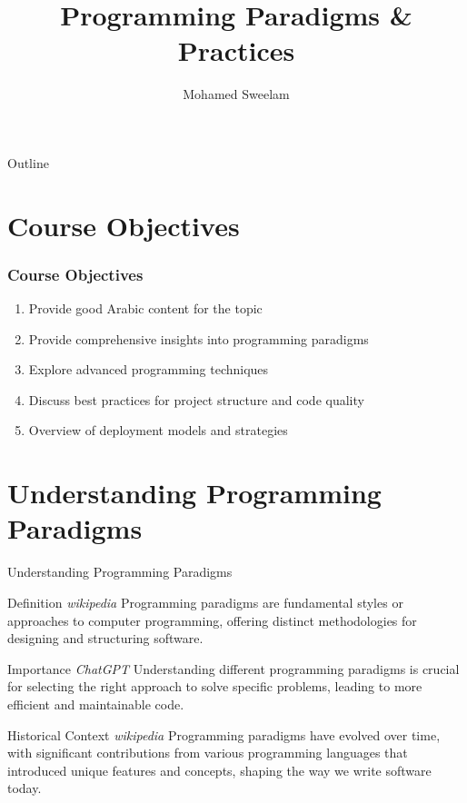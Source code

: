 \documentclass{beamer}
\title{Programming Paradigms \& Practices}
\author{Mohamed Sweelam}
\institute{Software Engineer}
\date{}
\begin{document}
\begin{frame}
  \titlepage
\end{frame}

\begin{frame}{Outline}
  \tableofcontents
\end{frame}

\section{Course Objectives}
\begin{frame}
	\frametitle{Course Objectives}
		\begin{enumerate}
			\item<1-> Provide good Arabic content for the topic
			\item<2-> Provide comprehensive insights into programming paradigms
			\item<3-> Explore advanced programming techniques
			\item<4-> Discuss best practices for project structure and code quality
			\item<5-> Overview of deployment models and strategies
		\end{enumerate}
\end{frame}

\section{Understanding Programming Paradigms}
\begin{frame}{Understanding Programming Paradigms}
	\scriptsize
	\begin{block}{Definition \tiny{\textit{wikipedia}}}
		Programming paradigms are fundamental styles or approaches to computer programming, offering distinct methodologies for designing and structuring software.
	\end{block}
	
	\begin{block}{Importance \tiny{\textit{ChatGPT}}}
		Understanding different programming paradigms is crucial for selecting the right approach to solve specific problems, leading to more efficient and maintainable code.
	\end{block}
	
	\begin{alertblock}{Historical Context \tiny{\textit{wikipedia}}}
		Programming paradigms have evolved over time, with significant contributions from various programming languages that introduced unique features and concepts, shaping the way we write software today.
	\end{alertblock}
  
\end{frame}
\end{document}
